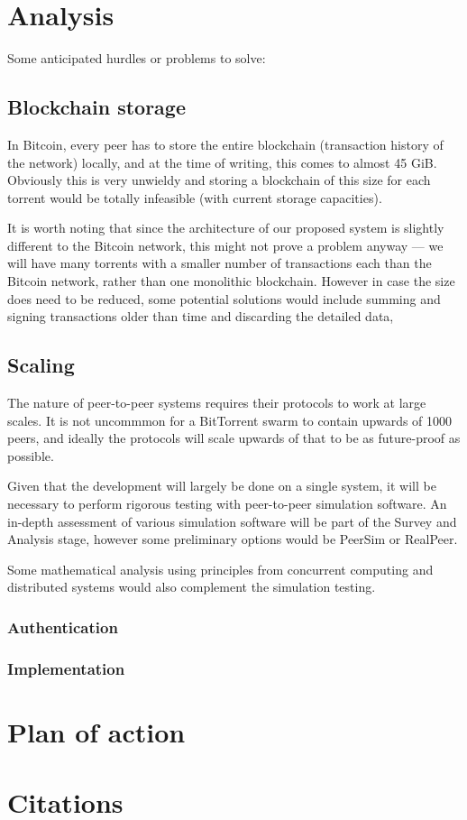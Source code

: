 \documentclass{article}
\begin{document}
\section{Analysis}
Some anticipated hurdles or problems to solve:

\subsection{Blockchain storage}
In Bitcoin, every peer has to store the entire blockchain (transaction history of the network) locally, and at the time of writing, this comes to almost 45 GiB.  Obviously this is very unwieldy and storing a blockchain of this size for each torrent would be totally infeasible (with current storage capacities).

It is worth noting that since the architecture of our proposed system is slightly different to the Bitcoin network, this might not prove a problem anyway --- we will have many torrents with a smaller number of transactions each than the Bitcoin network, rather than one monolithic blockchain.  However in case the size does need to be reduced, some potential solutions would include summing and signing transactions older than time  and discarding the detailed data,


\subsection{Scaling}
The nature of peer-to-peer systems requires their protocols to work at large scales.  It is not uncommmon for a BitTorrent swarm to contain upwards of 1000 peers, and ideally the protocols will scale upwards of that to be as future-proof as possible.

Given that the development will largely be done on a single system, it will be necessary to perform rigorous testing with peer-to-peer simulation software.  An in-depth assessment of various simulation software will be part of the Survey and Analysis stage, however some preliminary options would be PeerSim or RealPeer.

Some mathematical analysis using principles from concurrent computing and distributed systems would also complement the simulation testing.

\subsubsection{Authentication}


\subsubsection{Implementation}

\section{Plan of action}

\section{Citations}
\end{document}
